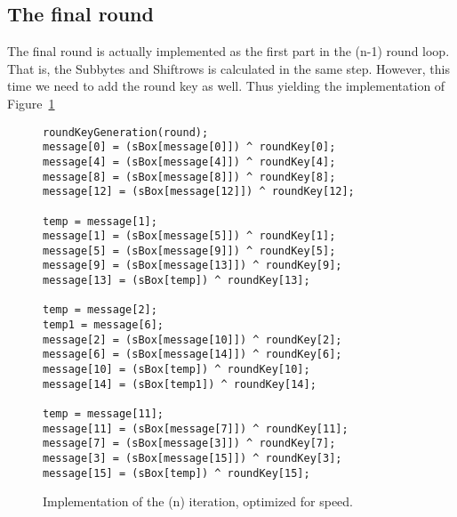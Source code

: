 \documentclass[Report.tex]{subfiles}
\begin{document}
\subsection{The final round}
The final round is actually implemented as the first part in the (n-1) round loop.
That is, the Subbytes and Shiftrows is calculated in the same step. However,
this time we need to add the round key as well. Thus yielding the implementation of Figure~\ref{FRspeed}
\begin{figure}[h]
\begin{lstlisting}[basicstyle=\tiny]
roundKeyGeneration(round);
message[0] = (sBox[message[0]]) ^ roundKey[0];
message[4] = (sBox[message[4]]) ^ roundKey[4];
message[8] = (sBox[message[8]]) ^ roundKey[8];
message[12] = (sBox[message[12]]) ^ roundKey[12];

temp = message[1];
message[1] = (sBox[message[5]]) ^ roundKey[1];
message[5] = (sBox[message[9]]) ^ roundKey[5];
message[9] = (sBox[message[13]]) ^ roundKey[9];
message[13] = (sBox[temp]) ^ roundKey[13];

temp = message[2];
temp1 = message[6];
message[2] = (sBox[message[10]]) ^ roundKey[2];
message[6] = (sBox[message[14]]) ^ roundKey[6];
message[10] = (sBox[temp]) ^ roundKey[10];
message[14] = (sBox[temp1]) ^ roundKey[14];

temp = message[11];
message[11] = (sBox[message[7]]) ^ roundKey[11];
message[7] = (sBox[message[3]]) ^ roundKey[7];
message[3] = (sBox[message[15]]) ^ roundKey[3];
message[15] = (sBox[temp]) ^ roundKey[15];
\end{lstlisting}
\caption{\label{FRspeed} Implementation of the (n) iteration, optimized for speed.}
\end{figure}
\end{document}
